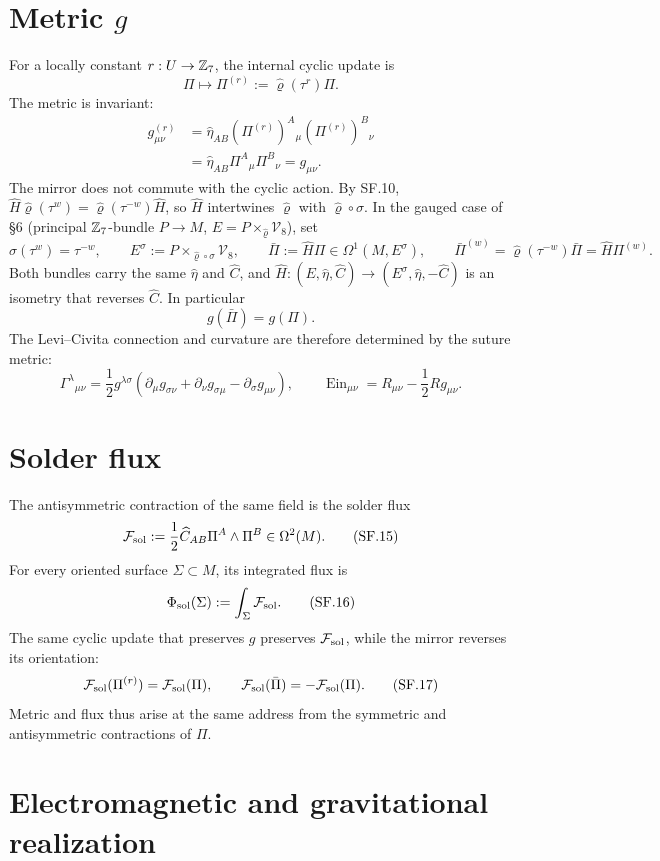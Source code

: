 \documentclass[10pt]{article}
\newcommand{\hateta}{\widehat\eta}
\newcommand{\hatC}{\widehat C}
\newcommand{\hatrho}{\widehat\varrho}
\newcommand{\hatH}{\widehat H}
\newcommand{\Fsol}{\mathcal F_{\rm sol}}
\begin{document}
\section{Metric $g$}

For a locally constant $r:U\to\mathbb Z_7$, the internal cyclic update is
\[
\Pi\longmapsto\Pi^{(r)}:=\hatrho(\tau^{r})\Pi.
\tag{SF.11}
\]
The metric is invariant:
\[
\begin{aligned}
g^{(r)}_{\mu\nu}
&=\hateta_{AB}(\Pi^{(r)})^A{}_{\mu}(\Pi^{(r)})^B{}_{\nu}\\
&=\hateta_{AB}\Pi^A{}_{\mu}\Pi^B{}_{\nu}
=g_{\mu\nu}.
\end{aligned}
\tag{SF.12}
\]
The mirror does not commute with the cyclic action. By SF.10,
$\hatH\hatrho(\tau^w)=\hatrho(\tau^{-w})\hatH$, so $\hatH$ intertwines $\hatrho$
with $\hatrho\circ\sigma$. In the gauged case of \S6 (principal $\mathbb Z_7$-bundle
$P\to M$, $E=P\times_{\hatrho}\mathcal V_8$), set
\[
\sigma(\tau^w)=\tau^{-w},\qquad
E^\sigma:=P\times_{\hatrho\circ\sigma}\mathcal V_8,\qquad
\bar\Pi:=\hatH\Pi\in\Omega^1(M,E^\sigma),\qquad
\bar\Pi^{(w)}=\hatrho(\tau^{-w})\bar\Pi=\hatH\Pi^{(w)}.
\tag{SF.13}
\]
Both bundles carry the same $\hateta$ and $\hatC$, and
$\hatH:(E,\hateta,\hatC)\to(E^\sigma,\hateta,-\hatC)$ is an isometry that
reverses $\hatC$. In particular
\[
g(\bar\Pi)=g(\Pi).
\tag{SF.13a}
\]
The Levi--Civita connection and curvature are therefore determined by the
suture metric:
\[
\Gamma^\lambda{}_{\mu\nu}
=\frac12g^{\lambda\sigma}
(\partial_\mu g_{\sigma\nu}+\partial_\nu g_{\sigma\mu}
-\partial_\sigma g_{\mu\nu}),
\qquad
\operatorname{Ein}_{\mu\nu}
=R_{\mu\nu}-\frac12Rg_{\mu\nu}.
\tag{SF.14}
\]

\section{Solder flux}

The antisymmetric contraction of the same field is the solder flux
\[
\Fsol:=\frac12\hatC_{AB}\Pi^A\wedge\Pi^B
\in\Omega^2(M).
\tag{SF.15}
\]
For every oriented surface $\Sigma\subset M$, its integrated flux is
\[
\Phi_{\rm sol}(\Sigma):=\int_\Sigma\Fsol.
\tag{SF.16}
\]
The same cyclic update that preserves $g$ preserves $\Fsol$, while the
mirror reverses its orientation:
\[
\Fsol(\Pi^{(r)})=\Fsol(\Pi),
\qquad
\Fsol(\bar\Pi)=-\Fsol(\Pi).
\tag{SF.17}
\]
Metric and flux thus arise at the same address from the symmetric and
antisymmetric contractions of $\Pi$.

\section{Electromagnetic and gravitational realization}
\end{document}
